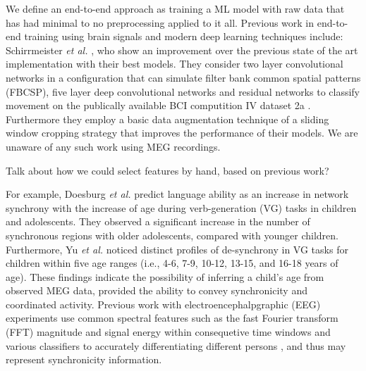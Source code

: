 \documentclass[utf8]{frontiersSCNS} %
\begin{document}
We define an end-to-end approach as training a ML model with raw data that has had minimal to no preprocessing applied to it all. Previous work in end-to-end training using brain signals and modern deep learning techniques include: Schirrmeister {\em et al.} \cite{Schirrmeister2017}, who show an improvement over the previous state of the art implementation with their best models. They consider two layer convolutional networks in a configuration that can simulate filter bank common spatial patterns (FBCSP), five layer deep convolutional networks and residual networks to classify movement on the publically available BCI computition IV dataset 2a \cite{}. Furthermore they employ a basic data augmentation technique of a sliding window cropping strategy that improves the performance of their models. We are unaware of any such work using MEG recordings.



Talk about how we could select features by hand, based on previous work?

For example, Doesburg {\em et al.} \cite{Doesburg2016} predict language ability as an increase in network synchrony with the increase of age during verb-generation (VG) tasks in children and adolescents. They observed a significant increase in the number of synchronous regions with older adolescents, compared with younger children. Furthermore, Yu {\em et al.} \cite{Yu2014} noticed distinct profiles of de-synchrony in VG tasks for children within five age ranges (i.e., 4-6, 7-9, 10-12, 13-15, and 16-18 years of age). These findings indicate the possibility of inferring a child's age from observed MEG data, provided the ability to convey synchronicity and coordinated activity.
Previous work with electroencephalpgraphic (EEG) experiments use common spectral features such as the fast Fourier transform (FFT) magnitude and signal energy within consequetive time windows and various classifiers to accurately differentiating different persons \cite{Nguyen2012, Poulos2001}, and thus may represent synchronicity information. 



\end{document}
